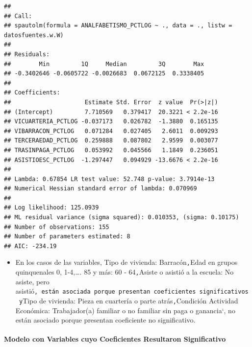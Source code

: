 \documentclass[11pt,]{article}
\newenvironment{Shaded}{\begin{snugshade}}{\end{snugshade}}
\newcommand{\KeywordTok}[1]{\textcolor[rgb]{0.13,0.29,0.53}{\textbf{#1}}}
\newcommand{\DataTypeTok}[1]{\textcolor[rgb]{0.13,0.29,0.53}{#1}}
\newcommand{\StringTok}[1]{\textcolor[rgb]{0.31,0.60,0.02}{#1}}
\newcommand{\OperatorTok}[1]{\textcolor[rgb]{0.81,0.36,0.00}{\textbf{#1}}}
\newcommand{\NormalTok}[1]{#1}
\providecommand{\tightlist}{%
\setlength{\itemsep}{0pt}\setlength{\parskip}{0pt}}
\begin{document}
\begin{verbatim}
## 
## Call: 
## spautolm(formula = ANALFABETISMO_PCTLOG ~ ., data = ., listw = datosfuentes.w.W)
## 
## Residuals:
##        Min         1Q     Median         3Q        Max 
## -0.3402646 -0.0605722 -0.0026683  0.0672125  0.3338405 
## 
## Coefficients: 
##                     Estimate Std. Error  z value  Pr(>|z|)
## (Intercept)         7.710569   0.379417  20.3221 < 2.2e-16
## VICUARTERIA_PCTLOG -0.037173   0.026782  -1.3880  0.165135
## VIBARRACON_PCTLOG   0.071284   0.027405   2.6011  0.009293
## TERCERAEDAD_PCTLOG  0.259888   0.087802   2.9599  0.003077
## TRASINPAGA_PCTLOG   0.053992   0.045566   1.1849  0.236051
## ASISTIOESC_PCTLOG  -1.297447   0.094929 -13.6676 < 2.2e-16
## 
## Lambda: 0.67854 LR test value: 52.748 p-value: 3.7914e-13 
## Numerical Hessian standard error of lambda: 0.070969 
## 
## Log likelihood: 125.0939 
## ML residual variance (sigma squared): 0.010353, (sigma: 0.10175)
## Number of observations: 155 
## Number of parameters estimated: 8 
## AIC: -234.19
\end{verbatim}

\begin{itemize}
\tightlist
\item
  En los casos de las variables, Tipo de vivienda:
  Barracón\texttt{,}Edad en grupos quinquenales 0, 1-4,\ldots{}. 85 y
  más: 60 - 64\texttt{,}Asiste o asistió a la escuela: No asiste, pero
  asistió\texttt{,\ están\ asociada\ porque\ presentan\ coeficientes\ significativos\ y}Tipo
  de vivienda: Pieza en cuartería o parte atrás\texttt{,}Condición
  Actividad Económica: Trabajador(a) familiar o no familiar sin paga o
  ganancia`, no están asociado porque presentan coeficiente no
  significativo.
\end{itemize}

\paragraph{Modelo con Variables cuyo Coeficientes Resultaron
Significativo}\label{modelo-con-variables-cuyo-coeficientes-resultaron-significativo-1}

\begin{Shaded}
\end{Shaded}
\end{document}
